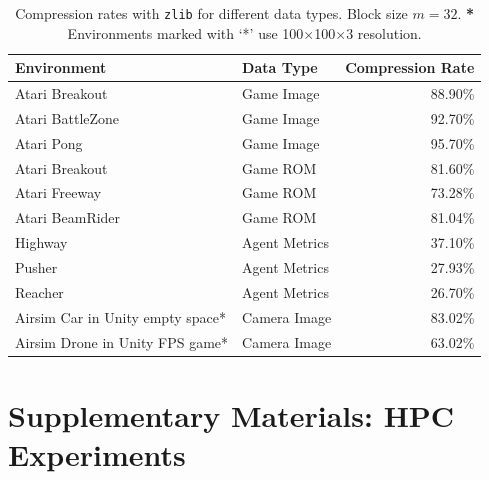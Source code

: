 \documentclass[10pt]{article} %
\begin{document}
\begin{table}[h]
\centering
\begin{tabular}{llr}
\toprule
\textbf{Environment} & \textbf{Data Type} & \textbf{Compression Rate} \\
\midrule
Atari Breakout & Game Image & 88.90\% \\
Atari BattleZone & Game Image & 92.70\% \\
Atari Pong & Game Image & 95.70\% \\
Atari Breakout & Game ROM & 81.60\% \\
Atari Freeway & Game ROM & 73.28\% \\
Atari BeamRider & Game ROM & 81.04\% \\
Highway & Agent Metrics & 37.10\% \\
Pusher & Agent Metrics & 27.93\% \\
Reacher & Agent Metrics & 26.70\% \\
Airsim Car in Unity empty space* & Camera Image & 83.02\% \\
Airsim Drone in Unity FPS game* & Camera Image & 63.02\% \\
\bottomrule
\end{tabular}
\caption{Compression rates with \texttt{zlib} \citep{MadlerZlib_adler_2024} for different data types.
Block size $m = 32$.
\newline \textbf{*} Environments marked with `*' use 100$\times$100$\times$3 resolution.}
\label{tab:ram_saved_diff}
\end{table}





\medskip


\beginSupplementaryMaterials

\section{Supplementary Materials: HPC Experiments}
\label{sec:supplementary_hpc}
\end{document}
